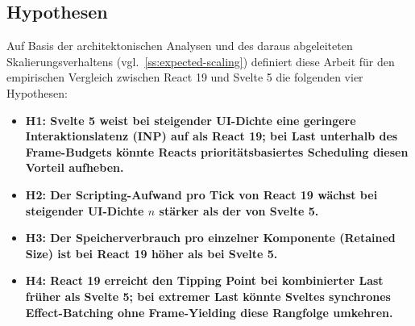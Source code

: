 \subsection{Hypothesen}
\label{ss:hypotheses}

Auf Basis der architektonischen Analysen und des daraus abgeleiteten Skalierungsverhaltens (vgl.\ \cref{ss:expected-scaling}) definiert diese Arbeit für den empirischen Vergleich zwischen React 19 und Svelte 5 die folgenden vier Hypothesen:
\begin{itemize}
	\item \textbf{H1: Svelte 5 weist bei steigender UI-Dichte eine geringere Interaktionslatenz (INP) auf als React 19; bei Last unterhalb des Frame-Budgets könnte Reacts prioritätsbasiertes Scheduling diesen Vorteil aufheben.}
	\item \textbf{H2: Der Scripting-Aufwand pro Tick von React 19 wächst bei steigender UI-Dichte $n$ stärker als der von Svelte 5.}
	\item \textbf{H3: Der Speicherverbrauch pro einzelner Komponente (Retained Size) ist bei React 19 höher als bei Svelte 5.}
	\item \textbf{H4: React 19 erreicht den Tipping Point bei kombinierter Last früher als Svelte 5; bei extremer Last könnte Sveltes synchrones Effect-Batching ohne Frame-Yielding diese Rangfolge umkehren.}
\end{itemize}


